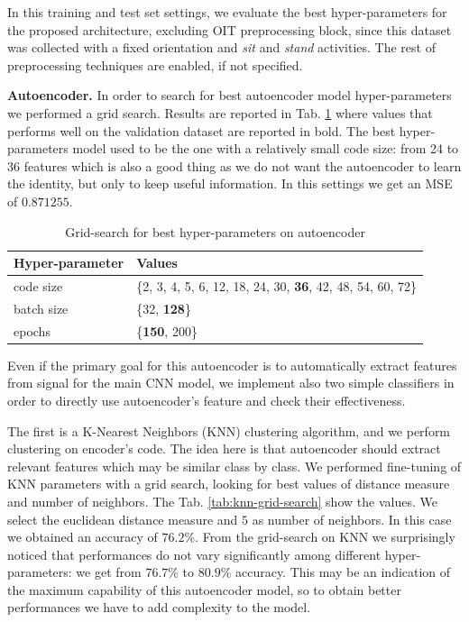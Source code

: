 In this training and test set settings, we evaluate the best
hyper-parameters for the proposed architecture, excluding OIT
preprocessing block, since this dataset was collected with a fixed
orientation and \textit{sit} and \textit{stand} activities. The rest of preprocessing techniques are enabled, if not
specified.

\textbf{Autoencoder.} In order to search for best autoencoder model
hyper-parameters we performed a grid search. Results are reported in
Tab. \ref{tab:ae-hyperparams} where values that performs well on the
validation dataset are reported in bold. The best hyper-parameters
model used to be the one with a relatively small code size: from 24 to
36 features which is also a good thing as we do not want the
autoencoder to learn the identity, but only to keep useful
information. In this settings we get an MSE of $0.871255$.
\begin{table}[h]
  \centering
  \begin{tabular}{lp{4cm}}
    \hline
    Hyper-parameter & Values \\
    \hline
    code size & \{2, 3, 4, 5, 6, 12, 18, 24, 30, \textbf{36}, 42, 48, 54, 60, 72\} \\
    batch size & \{32, \textbf{128}\} \\
    epochs & \{\textbf{150}, 200\} \\
    \hline
  \end{tabular}
  \caption{Grid-search for best hyper-parameters on autoencoder}
  \label{tab:ae-hyperparams}
\end{table}

Even if the primary goal for this autoencoder is to automatically
extract features from signal for the main CNN model, we implement also
two simple classifiers in order to directly use autoencoder's feature
and check their effectiveness.

The first is a K-Nearest Neighbors
(KNN) clustering algorithm, and we perform clustering on encoder's
code. The idea here is that autoencoder should extract relevant
features which may be similar class by class. We performed  fine-tuning of KNN parameters
with a grid search, looking for best values of distance measure and
number of neighbors. The Tab. \ref{tab:knn-grid-search} show the values.
We select the euclidean distance measure and $5$ as number of neighbors.
In this case we obtained an accuracy of $76.2$\%.
From the grid-search on KNN we surprisingly noticed that performances
do not vary significantly among different hyper-parameters: we get from
$76.7$\% to $80.9$\% accuracy. This may be an indication of the
maximum capability of this autoencoder model, so to obtain better
performances we have to add complexity to the model.

